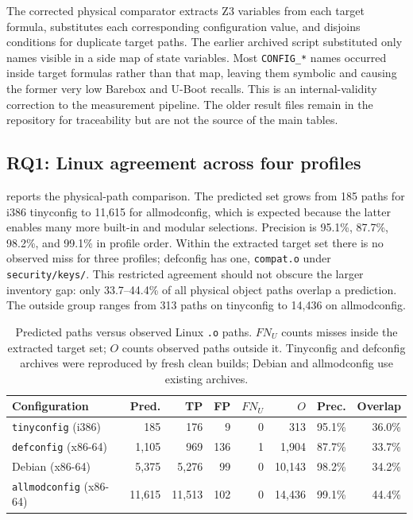 \documentclass[acmsmall,screen,review]{acmart}
\begin{document}
The corrected physical comparator extracts Z3 variables from each target formula, substitutes each corresponding configuration value, and disjoins conditions for duplicate target paths. The earlier archived script substituted only names visible in a side map of state variables. Most \texttt{CONFIG\_*} names occurred inside target formulas rather than that map, leaving them symbolic and causing the former very low Barebox and U-Boot recalls. This is an internal-validity correction to the measurement pipeline. The older result files remain in the repository for traceability but are not the source of the main tables.

\subsection{RQ1: Linux agreement across four profiles}
\label{sec:eval:linux}
 reports the physical-path comparison. The predicted set grows from 185 paths for i386 tinyconfig to 11,615 for allmodconfig, which is expected because the latter enables many more built-in and modular selections. Precision is 95.1\%, 87.7\%, 98.2\%, and 99.1\% in profile order. Within the extracted target set there is no observed miss for three profiles; defconfig has one, \texttt{compat.o} under \texttt{security/keys/}. This restricted agreement should not obscure the larger inventory gap: only 33.7--44.4\% of all physical object paths overlap a prediction. The outside group ranges from 313 paths on tinyconfig to 14,436 on allmodconfig.

\begin{table}[t]
\centering\footnotesize
\caption{Predicted paths versus observed Linux \texttt{.o} paths. $FN_U$ counts misses inside the extracted target set; $O$ counts observed paths outside it. Tinyconfig and defconfig archives were reproduced by fresh clean builds; Debian and allmodconfig use existing archives.}
\label{tab:linux-physical}
\begin{tabular}{lrrrrrrr}
\toprule
Configuration & Pred. & TP & FP & $FN_U$ & $O$ & Prec. & Overlap \\
\midrule
\texttt{tinyconfig} (i386) & 185 & 176 & 9 & 0 & 313 & 95.1\% & 36.0\% \\
\texttt{defconfig} (x86-64) & 1,105 & 969 & 136 & 1 & 1,904 & 87.7\% & 33.7\% \\
Debian (x86-64) & 5,375 & 5,276 & 99 & 0 & 10,143 & 98.2\% & 34.2\% \\
\texttt{allmodconfig} (x86-64) & 11,615 & 11,513 & 102 & 0 & 14,436 & 99.1\% & 44.4\% \\
\bottomrule
\end{tabular}
\end{table}
\end{document}
